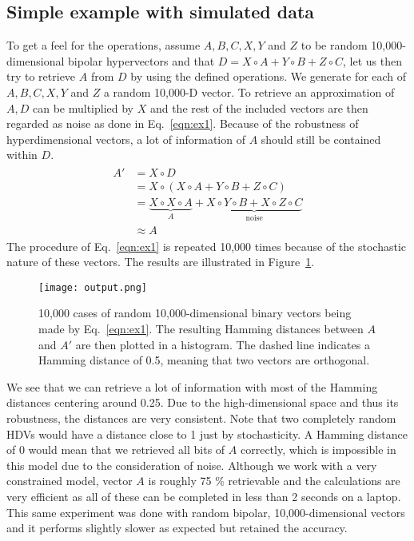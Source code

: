 \subsection*{Simple example with simulated data}
To get a feel for the operations, assume $A, B, C, X, Y$ and $Z$ to be random 10,000-dimensional bipolar hypervectors and that $D = X \circ A + Y \circ B + Z \circ C$, let us then try to retrieve $A$ from $D$ by using the defined operations. We generate for each of $A, B, C, X, Y$ and $Z$ a random 10,000-D vector. To retrieve an approximation of $A, D$ can be multiplied by $X$ and the rest of the included vectors are then regarded as noise as done in Eq.~\ref{eqn:ex1}. Because of the robustness of hyperdimensional vectors, a lot of information of $A$ should still be contained within $D$.
\begin{align}\label{eqn:ex1}
\begin{split}
    A' &= X \circ D \\
    &= X \circ (X \circ A + Y \circ B + Z \circ C) \\
    &= \underbrace{X \circ X \circ A}_A + \underbrace{X \circ Y \circ B + X \circ Z \circ C}_\text{noise} \\
    &\approx A
\end{split}
\end{align}
 The procedure of Eq.~\ref{eqn:ex1} is repeated 10,000 times because of the stochastic nature of these vectors. The results are illustrated in Figure~\ref{fig:exm1}.
\begin{figure}[h]
    \centering
    \texttt{[image: output.png]}
    \caption{10,000 cases of random 10,000-dimensional binary vectors being made by Eq.~\ref{eqn:ex1}. The resulting Hamming distances between $A$ and $A'$ are then plotted in a histogram. The dashed line indicates a Hamming distance of 0.5, meaning that two vectors are orthogonal.}
    \label{fig:exm1}
\end{figure}
We see that we can retrieve a lot of information with most of the Hamming distances centering around 0.25. Due to the high-dimensional space and thus its robustness, the distances are very consistent. Note that two completely random HDVs would have a distance close to 1 just by stochasticity. A Hamming distance of 0 would mean that we retrieved all bits of $A$ correctly, which is impossible in this model due to the consideration of noise. Although we work with a very constrained model, vector $A$ is roughly 75 \% retrievable and the calculations are very efficient as all of these can be completed in less than 2 seconds on a laptop. This same experiment was done with random bipolar, 10,000-dimensional vectors and it performs slightly slower as expected but retained the accuracy.
